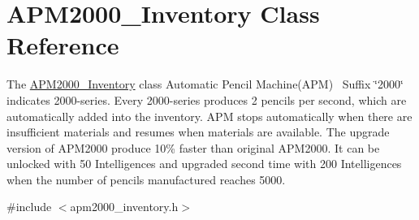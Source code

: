 \hypertarget{classAPM2000__Inventory}{}\section{A\+P\+M2000\+\_\+\+Inventory Class Reference}
\label{classAPM2000__Inventory}


The \mbox{\hyperlink{classAPM2000__Inventory}{A\+P\+M2000\+\_\+\+Inventory}} class Automatic Pencil Machine(\+A\+P\+M)~\newline
Suffix \char`\"{}2000\char`\"{} indicates 2000-\/series. Every 2000-\/series produces 2 pencils per second, which are automatically added into the inventory. A\+PM stops automatically when there are insufficient materials and resumes when materials are available. The upgrade version of A\+P\+M2000 produce 10\% faster than original A\+P\+M2000. It can be unlocked with 50 Intelligences and upgraded second time with 200 Intelligences when the number of pencils manufactured reaches 5000.  




{\ttfamily \#include $<$apm2000\+\_\+inventory.\+h$>$}

